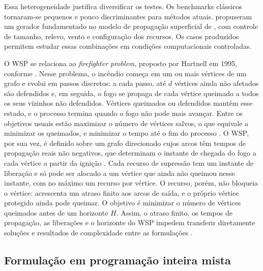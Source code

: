 Essa heterogeneidade justifica diversificar os testes. Os benchmarks
clássicos tornaram-se pequenos e pouco discriminantes para métodos atuais.
 propuseram um gerador fundamentado no modelo
de propagação superficial de , com controle de
tamanho, relevo, vento e configuração dos recursos. Os casos produzidos
permitem estudar essas combinações em condições computacionais controladas.

O WSP se relaciona ao \textit{firefighter problem}, proposto por Hartnell
em 1995, conforme . Nesse problema, o
incêndio começa em um ou mais vértices de um grafo e evolui em passos
discretos: a cada passo, até $d$ vértices ainda não afetados são defendidos
e, em seguida, o fogo se propaga de cada vértice queimado a todos os seus
vizinhos não defendidos. Vértices queimados ou defendidos mantêm esse estado,
e o processo termina quando o fogo não pode mais avançar. Entre os objetivos
usuais estão maximizar o número de vértices salvos, o que equivale a
minimizar os queimados, e minimizar o tempo até o fim do processo
\cite{FinbowMacGillivray2009}. O WSP, por sua vez, é definido sobre um grafo
direcionado cujos arcos têm tempos de propagação reais não negativos, que
determinam o instante de chegada do fogo a cada vértice a partir da ignição
\cite{DelazeriRitt2026}. Cada recurso de supressão tem um instante de
liberação e só pode ser alocado a um vértice que ainda não queimou nesse
instante, com no máximo um recurso por vértice. O recurso, porém, não bloqueia
o vértice: acrescenta um atraso finito aos arcos de saída, e o próprio
vértice protegido ainda pode queimar. O objetivo é minimizar o número de
vértices queimados antes de um horizonte $H$. Assim, o atraso finito, os
tempos de propagação, as liberações e o horizonte do WSP impedem transferir
diretamente soluções e resultados de complexidade entre as formulações
\cite{DelazeriRitt2026,FinbowMacGillivray2009}.

\subsection{Formulação em programação inteira mista}\label{sec:modelo-mip}

